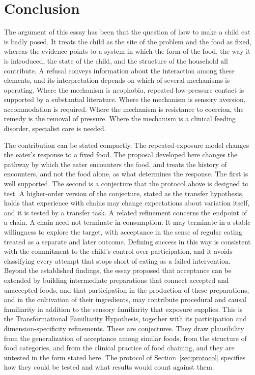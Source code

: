 \documentclass[11pt]{article}
\theoremstyle{remark}
\begin{document}
\section{Conclusion}\label{sec:conclusion}

The argument of this essay has been that the question of how to make a child eat is badly posed. It treats the child as the site of the problem and the food as fixed, whereas the evidence points to a system in which the form of the food, the way it is introduced, the state of the child, and the structure of the household all contribute. A refusal conveys information about the interaction among these elements, and its interpretation depends on which of several mechanisms is operating. Where the mechanism is neophobia, repeated low-pressure contact is supported by a substantial literature. Where the mechanism is sensory aversion, accommodation is required. Where the mechanism is resistance to coercion, the remedy is the removal of pressure. Where the mechanism is a clinical feeding disorder, specialist care is needed.


The contribution can be stated compactly. The repeated-exposure model changes the eater's response to a fixed food. The proposal developed here changes the pathway by which the eater encounters the food, and treats the history of encounters, and not the food alone, as what determines the response. The first is well supported. The second is a conjecture that the protocol above is designed to test. A higher-order version of the conjecture, stated as the transfer hypothesis, holds that experience with chains may change expectations about variation itself, and it is tested by a transfer task. A related refinement concerns the endpoint of a chain. A chain need not terminate in consumption. It may terminate in a stable willingness to explore the target, with acceptance in the sense of regular eating treated as a separate and later outcome. Defining success in this way is consistent with the commitment to the child's control over participation, and it avoids classifying every attempt that stops short of eating as a failed intervention.
Beyond the established findings, the essay proposed that acceptance can be extended by building intermediate preparations that connect accepted and unaccepted foods, and that participation in the production of these preparations, and in the cultivation of their ingredients, may contribute procedural and causal familiarity in addition to the sensory familiarity that exposure supplies. This is the Transformational Familiarity Hypothesis, together with its participation and dimension-specificity refinements. These are conjectures. They draw plausibility from the generalization of acceptance among similar foods, from the structure of food categories, and from the clinical practice of food chaining, and they are untested in the form stated here. The protocol of Section~\ref{sec:protocol} specifies how they could be tested and what results would count against them.
\end{document}
